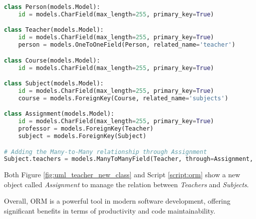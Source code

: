 \begin{lstlisting}[language=Python, caption={Example of ORM usage in Python with Django.}, label={script:orm}]
class Person(models.Model):
    id = models.CharField(max_length=255, primary_key=True)

class Teacher(models.Model):
    id = models.CharField(max_length=255, primary_key=True)
    person = models.OneToOneField(Person, related_name='teacher')

class Course(models.Model):
    id = models.CharField(max_length=255, primary_key=True)

class Subject(models.Model):
    id = models.CharField(max_length=255, primary_key=True)
    course = models.ForeignKey(Course, related_name='subjects')

class Assignment(models.Model):
    id = models.CharField(max_length=255, primary_key=True)
    professor = models.ForeignKey(Teacher)
    subject = models.ForeignKey(Subject)

# Adding the Many-to-Many relationship through Assignment
Subject.teachers = models.ManyToManyField(Teacher, through=Assignment, related_name='subjects')

\end{lstlisting}

 Both Figure \ref{fig:uml_teacher_new_class} and Script \ref{script:orm}
 show a new object called \textit{Assignment} to manage the relation between \textit{Teachers} and \textit{Subjects}.


Overall, ORM is a powerful tool in modern software development, offering significant benefits in terms of productivity and code maintainability. %


